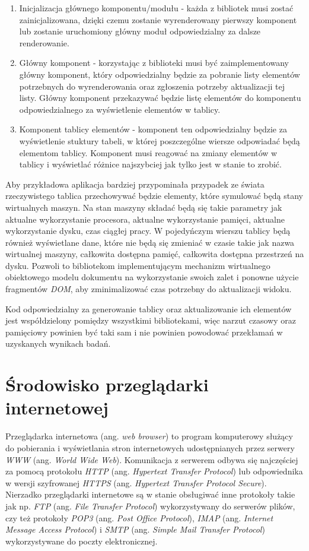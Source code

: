 \documentclass[polish, twoside, 12pt]{mwart}
\let\stdsection\section
\renewcommand*{\section}{\clearpage\stdsection}
\begin{document}
\begin{enumerate}
  \item Inicjalizacja głównego komponentu/modułu - każda z bibliotek musi zostać zainicjalizowana, dzięki czemu zostanie wyrenderowany pierwszy komponent lub zostanie uruchomiony główny moduł odpowiedzialny za dalsze renderowanie.
  \item Główny komponent - korzystając z biblioteki musi być zaimplementowany główny komponent, który odpowiedzialny będzie za pobranie listy elementów potrzebnych do wyrenderowania oraz zgłoszenia potrzeby aktualizacji tej listy. Główny komponent przekazywać będzie listę elementów do komponentu odpowiedzialnego za wyświetlenie elementów w tablicy.
  \item Komponent tablicy elementów - komponent ten odpowiedzialny będzie za wyświetlenie stuktury tabeli, w której poszczególne wiersze odpowiadać będą elementom tablicy. Komponent musi reagować na zmiany elementów w tablicy i wyświetlać różnice najszybciej jak tylko jest w stanie to zrobić.
\end{enumerate}

Aby przykładowa aplikacja bardziej przypominała przypadek ze świata rzeczywistego tablica przechowywać będzie elementy, które symulować będą stany wirtualnych maszyn. Na stan maszyny składać będą się takie parametry jak aktualne wykorzystanie procesora, aktualne wykorzystanie pamięci, aktualne wykorzystanie dysku, czas ciągłej pracy. W pojedyńczym wierszu tablicy będą również wyświetlane dane, które nie będą się zmieniać w czasie takie jak nazwa wirtualnej maszyny, całkowita dostępna pamięć, całkowita dostępna przestrzeń na dysku. Pozwoli to bibliotekom implementującym mechanizm wirtualnego obiektowego modelu dokumentu na wykorzystanie swoich zalet i ponowne użycie fragmentów \emph{DOM}, aby zminimalizować czas potrzebny do aktualizacji widoku.

Kod odpowiedzialny za generowanie tablicy oraz aktualizowanie ich elementów jest współdzielony pomiędzy wszystkimi bibliotekami, więc narzut czasowy oraz pamięciowy powinien być taki sam i nie powinien powodować przekłamań w uzyskanych wynikach badań.

\section{Środowisko przeglądarki internetowej}

Przeglądarka internetowa (ang. \emph{web browser}) to program komputerowy służący do pobierania i wyświetlania stron internetowych udostępnianych przez serwery \emph{WWW} (ang. \emph{World Wide Web}). Komunikacja z serwerem odbywa się najczęściej za pomocą protokołu \emph{HTTP} (ang. \emph{Hypertext Transfer Protocol}) lub odpowiednika w wersji szyfrowanej \emph{HTTPS} (ang. \emph{Hypertext Transfer Protocol Secure}). Nierzadko przeglądarki internetowe są w stanie obsługiwać inne protokoły takie jak np. \emph{FTP} (ang. \emph{File Transfer Protocol}) wykorzystywany do serwerów plików, czy też protokoły \emph{POP3} (ang. \emph{Post Office Protocol}), \emph{IMAP} (ang. \emph{Internet Message Access Protocol}) i \emph{SMTP} (ang. \emph{Simple Mail Transfer Protocol}) wykorzystywane do poczty elektronicznej. 
\end{document}
